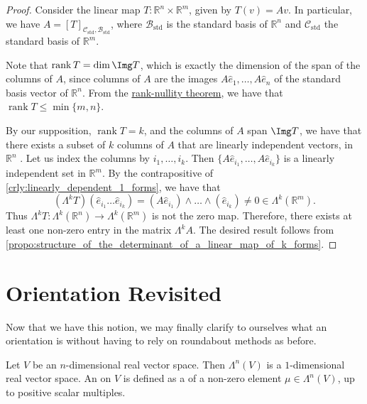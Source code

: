 \documentclass[notoc,notitlepage]{tufte-book}
\DeclareMathOperator{\std}{std}
\DeclareMathOperator{\rank}{rank}
\begin{document}
\begin{proof}
  Consider the linear map $T : \mathbb{R}^n \times \mathbb{R}^m$, given by $T(v)
  = Av$. In particular, we have $A = [T]_{\mathcal{C}_{\std},
  \mathcal{B}_{\std}}$, where $\mathcal{B}_{\std}$ is the standard basis of
  $\mathbb{R}^n$ and $\mathcal{C}_{\std}$ the standard basis of $\mathbb{R}^m$.

  Note that $\rank T = \dim \Img T$, which is exactly the dimension of the span of
  the columns of $A$, since columns of $A$ are the images $A\hat{e}_1, \ldots,
  A\hat{e}_n$ of the standard basis vector of $\mathbb{R}^n$. From the
  \hyperref[thm:rank_nullity_theorem]{rank-nullity theorem}, we have that $\rank
  T \leq \min \{ m, n \}$.

  By our supposition, $\rank T = k$, and the columns of $A$ span $\Img T$, we
  have that there exists a subset of $k$ columns of $A$ that are linearly
  independent vectors, in $\mathbb{R}^n$ . Let us index the columns by $i_1, \ldots, i_k$. Then
  $\{ A\hat{e}_{i_1}, \ldots, A\hat{e}_{i_k} \}$ is a linearly independent set
  in $\mathbb{R}^m$. By the contrapositive of
  \cref{crly:linearly_dependent_1_forms}, we have that
  \begin{equation*}
    (\Lambda^k T)(\hat{e}_{i_1} \hdots \hat{e}_{i_k}) = (A \hat{e}_{i_1}) \land
      \hdots \land (\hat{e}_{i_k}) \neq 0 \in \Lambda^k (\mathbb{R}^m).
  \end{equation*}
  Thus $\Lambda^k T : \Lambda^k (\mathbb{R}^n) \to \Lambda^k(\mathbb{R}^m)$ is
  not the zero map. Therefore, there exists at least one non-zero entry in the
  matrix $\Lambda^k A$. The desired result follows from
  \cref{propo:structure_of_the_determinant_of_a_linear_map_of_k_forms}.
\end{proof}


\section{Orientation Revisited}%
\label{sec:orientation_revisited}

Now that we have this notion, we may finally clarify to ourselves what an orientation
is without having to rely on roundabout methods as before.

\begin{defn}[Orientation]\label{defn:orientation}
  Let $V$ be an $n$-dimensional real vector space. Then $\Lambda^n(V)$ is a
  $1$-dimensional real vector space. An  on $V$ is defined as a
   of a non-zero element $\mu \in \Lambda^n(V)$, up to positive scalar
  multiples.
\end{defn}
\end{document}
